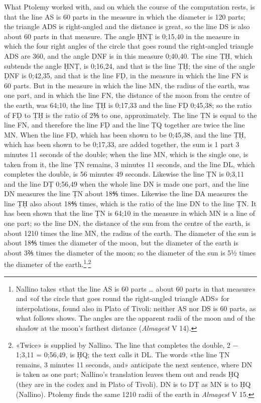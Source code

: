 \documentclass[11pt]{article}
\newcommand{\ArPage}[1]{\marginpar{\footnotesize\color{gray}Ar.\,p.\,#1}}
\begin{document}
\par \ArPage{90}What Ptolemy worked with, and on which the course of the computation rests, is that the line AS is 60 parts in the measure in which the diameter is 120 parts; the triangle ADS is right-angled and the distance is great, so the line DS is also about 60 parts in that measure. The angle ḤNṬ is 0;15,40 in the measure in which the four right angles of the circle that goes round the right-angled triangle ADS are 360, and the angle ḌNF is in this measure 0;40,40. The sine ṬḤ, which subtends the angle ḤNṬ, is 0;16,24, and that is the line ṬḤ; the sine of the angle ḌNF is 0;42,35, and that is the line FḌ, in the measure in which the line FN is 60 parts. But in the measure in which the line MN, the radius of the earth, was one part, and in which the line FN, the distance of the moon from the centre of the earth, was 64;10, the line ṬḤ is 0;17,33 and the line FḌ 0;45,38; so the ratio of FḌ to ṬḤ is the ratio of 2⅗ to one, approximately. The line ṬN is equal to the line FN, and therefore the line FḌ and the line ṬQ together are twice the line MN. When the line FḌ, which has been shown to be 0;45,38, and the line ṬḤ, which has been shown to be 0;17,33, are added together, the sum is 1 part 3 minutes 11 seconds of the double; when the line MN, which is the single one, is taken from it, the line ṬN remains, 3 minutes 11 seconds, and the line DL, which completes the double, is 56 minutes 49 seconds. Likewise the line ṬN is 0;3,11 and the line DṬ 0;56,49 when the whole line DN is made one part, and the line DN measures the line ṬN about 18⅘ times. Likewise the line DA measures the line ṬḤ also about 18⅘ times, which is the ratio of the line DN to the line ṬN. It has been shown that the line ṬN is 64;10 in the measure in which MN is a line of one part; so the line DN, the distance of the sun from the centre of the earth, is about 1210 times the line MN, the radius of the earth. The diameter of the sun is about 18⅘ times the diameter of the moon, but the diameter of the earth is about 3⅖ times the diameter of the moon; so the diameter of the sun is 5½ times the diameter of the earth.\footnote{Nallino takes «that the line AS is 60 parts … about 60 parts in that measure» and «of the circle that goes round the right-angled triangle ADS» for interpolations, found also in Plato of Tivoli: neither AS nor DS is 60 parts, as what follows shows. The angles are the apparent radii of the moon and of the shadow at the moon's farthest distance (\emph{Almagest} V 14).}\textsuperscript{,}\footnote{«Twice» is supplied by Nallino. The line that completes the double, 2 − 1;3,11 = 0;56,49, is ḤQ; the text calls it DL. The words «the line ṬN remains, 3 minutes 11 seconds, and» anticipate the next sentence, where DN is taken as one part; Nallino's translation leaves them out and reads ḤQ (they are in the codex and in Plato of Tivoli). DN is to DṬ as MN is to ḤQ (Nallino). Ptolemy finds the same 1210 radii of the earth in \emph{Almagest} V 15.}\par
\end{document}
